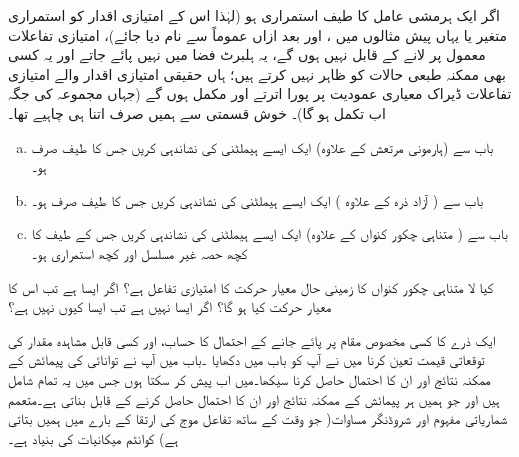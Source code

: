 اگر ایک ہرمشی عامل کا طیف استمراری ہو (لہٰذا اس کے امتیازی اقدار کو استمراری متغیر  یا یہاں پیش مثالوں میں ، اور بعد ازاں عموماً  سے نام دیا جائے)، امتیازی تفاعلات معمول پر لانے کے قابل نہیں ہوں گے، یہ ہلبرٹ فضا میں نہیں پائے جاتے اور یہ کسی بھی ممکنہ طبعی حالات کو ظاہر نہیں کرتے ہیں؛ ہاں حقیقی امتیازی اقدار والے امتیازی تفاعلات ڈیراک معیاری عمودیت پر پورا اترتے اور مکمل ہوں گے (جہاں مجموعہ کی جگہ اب تکمل ہو گا)۔ خوش قسمتی سے ہمیں صرف اتنا ہی چاہیے تھا۔
\begin{enumerate}[a.]
\item
 باب  سے (ہارمونی مرتعش کے علاوہ) ایک ایسے ہیملٹنی کی نشاندہی کریں جس کا طیف صرف  ہو۔ 
\item
باب  سے ( آزاد ذرہ کے علاوہ ) ایک ایسے ہیملٹنی کی نشاندہی کریں جس کا طیف صرف  ہو۔ 
\item
 باب  سے ( متناہی چکور کنواں کے علاوہ) ایک ایسے ہیملٹنی کی نشاندہی کریں جس کے طیف کا کچھ حصہ غیر مسلسل اور کچھ استمراری ہو۔ 
\end{enumerate}
کیا لا متناہی چکور کنواں کا زمینی حال معیار حرکت کا امتیازی تفاعل ہے؟ اگر ایسا ہے تب اس کا معیار حرکت کیا ہو گا؟ اگر ایسا نہیں ہے تب ایسا کیوں نہیں ہے؟

ایک ذرے کا کسی مخصوص مقام پر پائے جانے کے احتمال کا حساب، اور کسی قابل مشاہدہ مقدار کی توقعاتی قیمت تعین کرنا میں نے آپ کو باب  میں دکھایا ۔باب  میں آپ نے توانائی کی پیمائش کے ممکنہ نتائج اور ان کا احتمال حاصل کرنا سیکھا۔میں اب  پیش کر سکتا ہوں جس میں یہ تمام شامل ہیں اور جو ہمیں ہر پیمائش کے ممکنہ نتائج اور ان کا احتمال حاصل کرنے کے قابل بناتی ہے۔متعمم شماریاتی مفہوم اور شروڈنگر مساوات( جو وقت کے ساتھ تفاعل موج کی ارتقا کے بارے میں ہمیں بتاتی ہے) کوانٹم میکانیات کی بنیاد ہے۔

